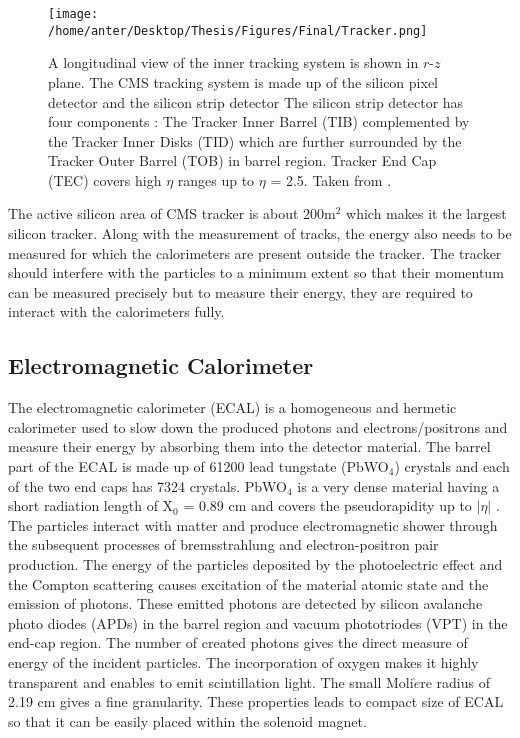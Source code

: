 \begin{figure}[h]
\begin{center} 
\vspace*{2mm}
\hspace*{-6mm}
\texttt{[image: /home/anter/Desktop/Thesis/Figures/Final/Tracker.png]}
\caption[A longitudinal view of the inner tracking system is shown in $r$-$z$ plane.]{A longitudinal view of the inner tracking system is shown in $r$-$z$ plane. The CMS tracking system is made up of the silicon pixel detector and the silicon strip detector  The silicon strip detector has four components : The Tracker Inner Barrel (TIB) complemented by the Tracker Inner Disks (TID) which are further surrounded by the Tracker Outer Barrel (TOB) in barrel region. Tracker End Cap (TEC) covers high $\eta$ ranges up to $\eta$ = 2.5. Taken from \cite{Chatrchyan:2008aa}.}
\label{fig:tracker}
\end{center}
\end{figure}
The active silicon area of CMS tracker is about 200m$^{2}$ which makes it the largest silicon tracker. Along with the measurement of tracks, the energy also needs to be measured for which the calorimeters are present outside the tracker. The tracker should interfere with the particles to a minimum extent so that their momentum can be measured precisely but to measure their energy, they are required to interact with the calorimeters fully.

\subsection{Electromagnetic Calorimeter}
The electromagnetic calorimeter (ECAL) is a homogeneous and hermetic calorimeter used to slow down the produced photons and electrons/positrons and measure their energy by absorbing them into the detector material. The barrel part of the ECAL is made up of 61200 lead tungstate (PbWO$_4$) crystals and each of the two end caps has 7324 crystals. PbWO$_4$ is a very dense material having a short radiation length of X$_0$ = 0.89 cm and covers the pseudorapidity up to $|\eta|$ . The particles interact with matter and produce electromagnetic shower through the subsequent processes of bremsstrahlung and electron-positron pair production. The energy of the particles deposited by the photoelectric effect and the Compton scattering causes excitation of the material atomic state and the emission of photons. These emitted photons are detected by silicon avalanche photo diodes (APDs) in the barrel region and vacuum phototriodes (VPT) in the end-cap region. The number of created photons gives the direct measure of energy of the incident particles. The incorporation of oxygen makes it highly transparent and enables to emit scintillation light. The small Moli$\grave{e}$re radius of 2.19 cm gives a fine granularity. These properties leads to compact size of ECAL so that it can be easily placed within the solenoid magnet. 

